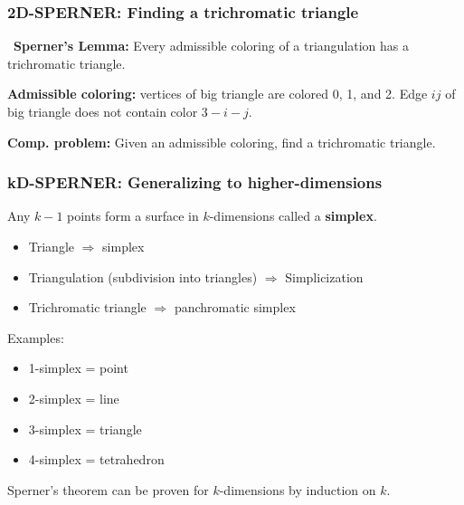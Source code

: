 \documentclass[10pt]{beamer}
\begin{document}
\begin{frame}
\frametitle{2D-SPERNER: Finding a trichromatic triangle}

\
\textbf{Sperner's Lemma:} Every admissible coloring of a triangulation has
a trichromatic triangle.

\textbf{Admissible coloring:} vertices of big triangle are colored 0, 1, and 2.
Edge $ij$ of big triangle does not contain color $3-i-j$.

\textbf{Comp. problem:} Given an admissible coloring, find a trichromatic
triangle.

\begin{figure}[hbt]
  
  \centerline{\box\graph}
\end{figure}

\end{frame}
\begin{frame}
\frametitle{kD-SPERNER: Generalizing to higher-dimensions}

Any $k-1$ points form a surface in $k$-dimensions called a \textbf{simplex}.

\begin{itemize}
\item Triangle $\Rightarrow$ simplex
\item Triangulation (subdivision into triangles) $\Rightarrow$ Simplicization
\item Trichromatic triangle $\Rightarrow$ panchromatic simplex
\end{itemize}

Examples:

\begin{itemize}
\item 1-simplex = point
\item 2-simplex = line
\item 3-simplex = triangle
\item 4-simplex = tetrahedron
\end{itemize}

Sperner's theorem can be proven for $k$-dimensions by induction on $k$.

\end{frame}
\end{document}
